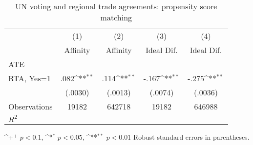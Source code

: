\begin{table} \footnotesize \begin{threeparttable} \caption{UN voting and regional trade agreements: propensity score matching}         \label{table:affinity1} \centering       {}         \begin{tabular}{l*{4}{c}} \toprule \toprule
                    &\multicolumn{1}{c}{(1)}        &\multicolumn{1}{c}{(2)}        &\multicolumn{1}{c}{(3)}        &\multicolumn{1}{c}{(4)}        \\
                    &    Affinity        &    Affinity        &  Ideal Dif.        &  Ideal Dif.        \\
\midrule 
ATE                 &                    &                    &                    &                    \\
RTA, Yes=1    &        .082\sym{**}&        .114\sym{**}&       -.167\sym{**}&       -.275\sym{**}\\
                    &     (.0030)        &     (.0013)        &     (.0074)        &     (.0036)        \\
\midrule
Observations        &       19182        &      642718        &       19182        &      646988        \\
\(R^{2}\)           &                    &                    &                    &                    \\
\bottomrule \end{tabular}         \begin{tablenotes}                 \small \item \sym{+} \(p<0.1\), \sym{*} \(p<0.05\), \sym{**} \(p<0.01\) Robust standard errors in parentheses. \\                 \end{tablenotes}  \end{threeparttable} \end{table} 
